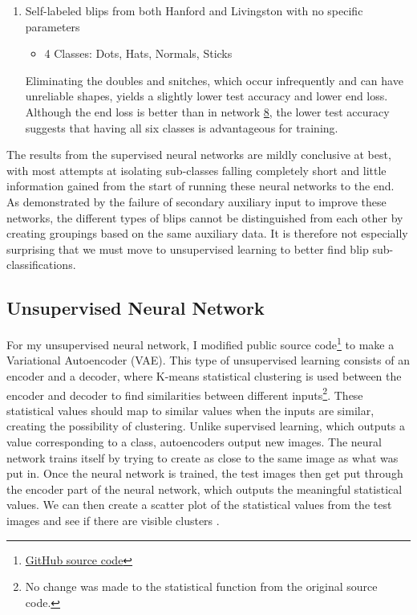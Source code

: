\documentclass[a4paper]{article}
\begin{document}
\begin{enumerate}
	\item Self-labeled blips from both Hanford and Livingston with no specific parameters
	\begin{itemize}
		\item 4 Classes: Dots, Hats, Normals, Sticks
	\end{itemize} Eliminating the doubles and snitches, which occur infrequently and can have unreliable shapes, yields a slightly lower test accuracy and lower end loss. Although the end loss is better than in network \hyperlink{multi}{8}, the lower test accuracy suggests that having all six classes is advantageous for training.
	
\end{enumerate}

\noindent The results from the supervised neural networks are mildly conclusive at best, with most attempts at isolating sub-classes falling completely short and little information gained from the start of running these neural networks to the end. As demonstrated by the failure of secondary auxiliary input to improve these networks, the different types of blips cannot be distinguished from each other by creating groupings based on the same auxiliary data. It is therefore not especially surprising that we must move to unsupervised learning to better find blip sub-classifications.

\subsection{Unsupervised Neural Network} \label{section:unsup}

For my unsupervised neural network, I modified public source code\footnote{\href{https://github.com/keras-team/keras/blob/master/examples/variational_autoencoder.py}{GitHub source code}} to make a Variational Autoencoder (VAE). This type of unsupervised learning consists of an encoder and a decoder, where K-means statistical clustering is used between the encoder and decoder to find similarities between different inputs\footnote{No change was made to the statistical function from the original source code.}. These statistical values should map to similar values when the inputs are similar, creating the possibility of clustering. Unlike supervised learning, which outputs a value corresponding to a class, autoencoders output new images. The neural network trains itself by trying to create as close to the same image as what was put in. Once the neural network is trained, the test images then get put through the encoder part of the neural network, which outputs the meaningful statistical values. We can then create a scatter plot of the statistical values from the test images and see if there are visible clusters \cite{Kingma:2013}. 
\end{document}
